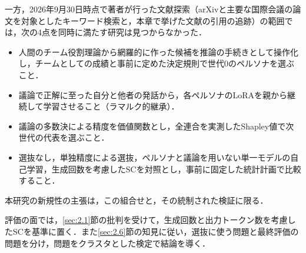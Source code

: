 一方，2026年9月30日時点で著者が行った文献探索（arXivと主要な国際会議の論文を対象としたキーワード検索と，本章で挙げた文献の引用の追跡）の範囲では，次の4点を同時に満たす研究は見つからなかった．
\begin{itemize}
\item[（i）] 人間のチーム役割理論から網羅的に作った候補を推論の手続きとして操作化し，チームとしての成績と事前に定めた決定規則で世代0のペルソナを選ぶこと．
\item[（ii）] 議論で正解に至った自分と他者の発話から，各ペルソナのLoRAを親から継続して学習させること（ラマルク的継承）．
\item[（iii）] 議論の多数決による精度を価値関数とし，全連合を実測したShapley値で次世代の代表を選ぶこと．
\item[（iv）] 選抜なし，単独精度による選抜，ペルソナと議論を用いない単一モデルの自己学習，生成回数を考慮したSCを対照とし，事前に固定した統計計画で比較すること．
\end{itemize}
本研究の新規性の主張は，この組合せと，その統制された検証に限る．

評価の面では，\ref{sec:2.1}節の批判を受けて，生成回数と出力トークン数を考慮したSCを基準に置く．また\ref{sec:2.6}節の知見に従い，選抜に使う問題と最終評価の問題を分け，問題をクラスタとした検定で結論を導く．
